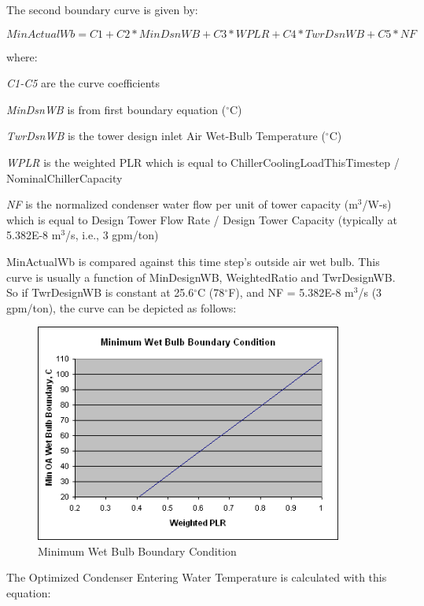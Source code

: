 The second boundary curve is given by:

\begin{equation}
MinActualWb = C1 + C2*MinDsnWB + C3*WPLR + C4*TwrDsnWB + C5*NF
\end{equation}

where:

\emph{C1-C5} are the curve coefficients

\emph{MinDsnWB} is from first boundary equation (\(^{\circ}\)C)

\emph{TwrDsnWB} is the tower design inlet Air Wet-Bulb Temperature (\(^{\circ}\)C)

\emph{WPLR} is the weighted PLR which is equal to ChillerCoolingLoadThisTimestep / NominalChillerCapacity

\emph{NF} is the normalized condenser water flow per unit of tower capacity (m\(^3\)/W-s) which is equal to Design Tower Flow Rate / Design Tower Capacity (typically at 5.382E-8 m\(^3\)/s, i.e., 3 gpm/ton)

MinActualWb is compared against this time step's outside air wet bulb. This curve is usually a function of MinDesignWB, WeightedRatio and TwrDesignWB. So if TwrDesignWB is constant at 25.6\(^{\circ}\)C (78\(^{\circ}\)F), and NF = 5.382E-8 m\(^3\)/s (3 gpm/ton), the curve can be depicted as follows:

\begin{figure}[hbtp] %
\centering
\includegraphics[width=0.9\textwidth, height=0.9\textheight, keepaspectratio=true]{media/image6483.png}
\caption{Minimum Wet Bulb Boundary Condition \protect \label{fig:minimum-wet-bulb-boundary-condition}}
\end{figure}

The Optimized Condenser Entering Water Temperature is calculated with this equation:

